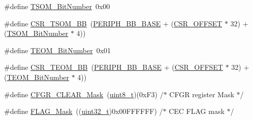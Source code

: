 \begin{DoxyCompactItemize}
\item 
\#define \hyperlink{group___c_e_c___private___defines_ga1a470abab836eba7b451950938708946}{T\+S\+O\+M\+\_\+\+Bit\+Number}~0x00
\item 
\#define \hyperlink{group___c_e_c___private___defines_ga4971cc50b0ead4a493e2a9c03966c826}{C\+S\+R\+\_\+\+T\+S\+O\+M\+\_\+\+BB}~(\hyperlink{openmotestm_2library_2inc_2stm32f10x__map_8h_aed7efc100877000845c236ccdc9e144a}{P\+E\+R\+I\+P\+H\+\_\+\+B\+B\+\_\+\+B\+A\+SE} + (\hyperlink{openmotestm_2library_2src_2stm32f10x__rcc_8c_a984cbe73312b6d3d355c5053763d499a}{C\+S\+R\+\_\+\+O\+F\+F\+S\+ET} $\ast$ 32) + (\hyperlink{group___c_e_c___private___defines_ga1a470abab836eba7b451950938708946}{T\+S\+O\+M\+\_\+\+Bit\+Number} $\ast$ 4))
\item 
\#define \hyperlink{group___c_e_c___private___defines_gac86378eff7728e5cfca5480ab2dbef0b}{T\+E\+O\+M\+\_\+\+Bit\+Number}~0x01
\item 
\#define \hyperlink{group___c_e_c___private___defines_ga9ac493d98ce1f6d82b778ace0f2bc7bb}{C\+S\+R\+\_\+\+T\+E\+O\+M\+\_\+\+BB}~(\hyperlink{openmotestm_2library_2inc_2stm32f10x__map_8h_aed7efc100877000845c236ccdc9e144a}{P\+E\+R\+I\+P\+H\+\_\+\+B\+B\+\_\+\+B\+A\+SE} + (\hyperlink{openmotestm_2library_2src_2stm32f10x__rcc_8c_a984cbe73312b6d3d355c5053763d499a}{C\+S\+R\+\_\+\+O\+F\+F\+S\+ET} $\ast$ 32) + (\hyperlink{group___c_e_c___private___defines_gac86378eff7728e5cfca5480ab2dbef0b}{T\+E\+O\+M\+\_\+\+Bit\+Number} $\ast$ 4))
\item 
\#define \hyperlink{group___c_e_c___private___defines_gaaedf9b8df17534f5eaf75ec1ca3fbd7a}{C\+F\+G\+R\+\_\+\+C\+L\+E\+A\+R\+\_\+\+Mask}~(\hyperlink{_p_e___types_8h_aba7bc1797add20fe3efdf37ced1182c5}{uint8\+\_\+t})(0x\+F3)        /$\ast$ C\+F\+G\+R register Mask $\ast$/
\item 
\#define \hyperlink{group___c_e_c___private___defines_ga2be62bf481cd44de9ab604efe5595ff6}{F\+L\+A\+G\+\_\+\+Mask}~((\hyperlink{_p_e___types_8h_a33594304e786b158f3fb30289278f5af}{uint32\+\_\+t})0x00\+F\+F\+F\+F\+F\+F) /$\ast$ C\+E\+C F\+L\+A\+G mask $\ast$/
\end{DoxyCompactItemize}
